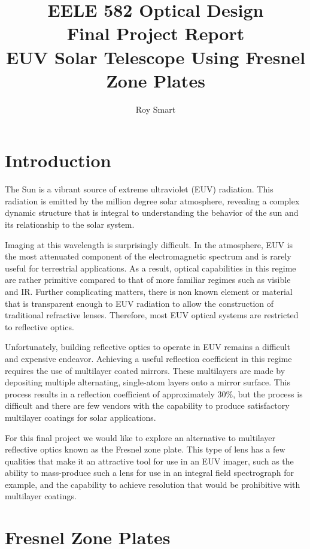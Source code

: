 \documentclass[10pt,letterpaper]{article}
\author{Roy Smart}
\title{EELE 582 Optical Design \\ Final Project Report \\ EUV Solar Telescope Using Fresnel Zone Plates}
\begin{document}
	\maketitle
	
	\section{Introduction}
	
		The Sun is a vibrant source of extreme ultraviolet (EUV) radiation. This radiation is emitted by the million degree solar atmosphere, revealing a complex dynamic structure that is integral to understanding the behavior of the sun and its relationship to the solar system.
		
		Imaging at this wavelength is surprisingly difficult. In the atmosphere, EUV is the most attenuated component of the electromagnetic spectrum and is rarely useful for terrestrial applications. As a result, optical capabilities in this regime are rather primitive compared to that of more familiar regimes such as visible and IR. Further complicating matters, there is non known element or material that is transparent enough to EUV radiation to allow the construction of traditional refractive lenses. Therefore, most EUV optical systems are restricted to reflective optics.
		
		Unfortunately, building reflective optics to operate in EUV remains a difficult and expensive endeavor. Achieving a useful reflection coefficient in this regime requires the use of multilayer coated mirrors. These multilayers are made by depositing multiple alternating, single-atom layers onto a mirror surface. This process results in a reflection coefficient of approximately 30\%, but the process is difficult and there are few vendors with the capability to produce satisfactory multilayer coatings for solar applications.
		
		For this final project we would like to explore an alternative to multilayer reflective optics known as the Fresnel zone plate. This type of lens has a few qualities that make it an attractive tool for use in an EUV imager, such as the ability to mass-produce such a lens for use in an integral field spectrograph for example, and the capability to achieve resolution that would be prohibitive with multilayer coatings.
		
	
	\section{Fresnel Zone Plates}
		
\end{document}
